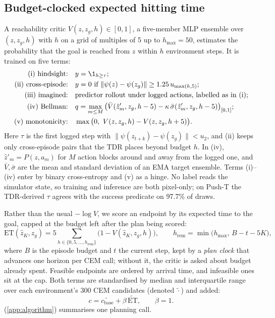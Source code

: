 \documentclass{article} %
\newcommand{\z}{z}
\newcommand{\psiT}{\psi}
\newcommand{\ET}{\mathrm{ET}}
\begin{document}
\subsection{Budget-clocked expected hitting time}
\label{sec:critic}
A reachability critic $V(\z,\z_g,h)\in[0,1]$, a five-member MLP ensemble over $(\z,\z_g,h)$ with
$h$ on a grid of multiples of 5 up to $h_{\max}=50$, estimates the probability that the goal is
reached from $\z$ within $h$ environment steps. It is trained on five terms:
\begin{align}
  \text{(i) hindsight:}\quad & y=\1_{h\ge\tau}; \notag\\
  \text{(ii) cross-episode:}\quad & y=0\ \text{if}\ \|\psiT(\z)-\psiT(\z_g)\|\ge 1.25\,u_{\max(h,5)}; \notag\\
  \text{(iii) imagined:}\quad & \text{predictor rollout under logged actions, labelled as in (i)};
    \notag\\
  \text{(iv) Bellman:}\quad & q=\max_{m\le M}\big(\bar V(\hat\z'_m,\z_g,h-5)-\kappa\,
    \bar\sigma(\hat\z'_m,\z_g,h-5)\big)_{[0,1]}; \notag\\
  \text{(v) monotonicity:}\quad & \max\big(0,\ V(\z,\z_g,h)-V(\z,\z_g,h+5)\big). \notag
\end{align}
Here $\tau$ is the first logged step with $\|\psiT(\z_{t+k})-\psiT(\z_g)\|<u_2$, and (ii) keeps only
cross-episode pairs that the TDR places beyond budget $h$. In (iv), $\hat\z'_m=P(\z,a_m)$ for $M$
action blocks around and away from the logged one, and $\bar V,\bar\sigma$ are the mean and standard
deviation of an EMA target ensemble. Terms (i)--(iv) enter by binary cross-entropy and (v) as a
hinge. No label reads the simulator state, so training and inference are both pixel-only; on
Push-T the TDR-derived $\tau$ agrees with the success predicate on 97.7\% of draws.

Rather than the usual $-\log V$, we score an endpoint by its expected time to the goal, capped at
the budget left after the plan being scored:
\begin{equation}
  \ET(\hat\z_K, \z_g)=5\sum_{h\in\{0,5,\dots,h_{\mathrm{rem}}\}}\big(1-V(\hat\z_K,\z_g,h)\big),
  \qquad h_{\mathrm{rem}}=\min\big(h_{\max},\,B-t-5K\big),
  \label{eq:et}
\end{equation}
where $B$ is the episode budget and $t$ the current step, kept by a \emph{plan clock} that advances
one horizon per CEM call; without it, the critic is asked about budget already spent. Feasible
endpoints are ordered by arrival time, and infeasible ones sit at the cap. Both terms are
standardised by median and interquartile range over each environment's 300 CEM candidates
(denoted $\tilde{\cdot}$) and added:
\begin{equation}
  c=\widetilde{c_{\mathrm{base}}}+\beta\,\widetilde{\ET},\qquad \beta=1.
  \label{eq:compose}
\end{equation}
 (\cref{app:algorithm}) summarises one planning call.
\end{document}
